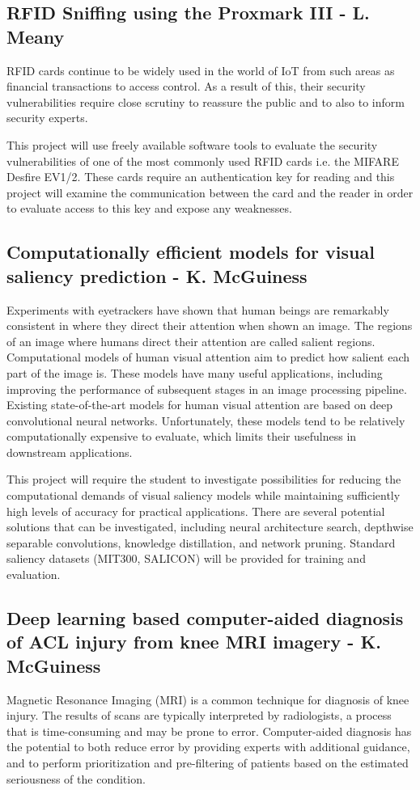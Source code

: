 \documentclass[a4paper]{article}
\begin{document}
\subsection{RFID Sniffing using the Proxmark III - L. Meany}
RFID cards continue to be widely used in the world of IoT from such areas as financial transactions to access control. As a result of this, their security vulnerabilities require close scrutiny to reassure the public and to also to inform security experts.

This project will use freely available software tools to evaluate the security vulnerabilities of one of the most commonly used RFID cards i.e. the MIFARE Desfire EV1/2. These cards require an authentication key for reading and this project will examine the communication between the card and the reader in order to evaluate access to this key and expose any weaknesses.

\subsection{Computationally efficient models for visual saliency prediction - K.
McGuiness}
Experiments with eyetrackers have shown that human beings are remarkably consistent in where they direct their attention when shown an image. The regions of an image where humans direct their attention are called salient regions. Computational models of human visual attention aim to predict how salient each part of the image is. These models have many useful applications, including improving the performance of subsequent stages in an image processing pipeline. Existing state-of-the-art models for human visual attention are based on deep convolutional neural networks. Unfortunately, these models tend to be relatively computationally expensive to evaluate, which limits their usefulness in downstream applications.

This project will require the student to investigate possibilities for reducing the computational demands of visual saliency models while maintaining sufficiently high levels of accuracy for practical applications. There are several potential solutions that can be investigated, including neural architecture search, depthwise separable convolutions, knowledge distillation, and network pruning. Standard saliency datasets (MIT300, SALICON) will be provided for training and evaluation.

\subsection{Deep learning based computer-aided diagnosis of ACL injury from knee
MRI imagery - K. McGuiness}
Magnetic Resonance Imaging (MRI) is a common technique for diagnosis of knee injury. The results of scans are typically interpreted by radiologists, a process that is time-consuming and may be prone to error. Computer-aided diagnosis has the potential to both reduce error by providing experts with additional guidance, and to perform prioritization and pre-filtering of patients based on the estimated seriousness of the condition.
\end{document}
